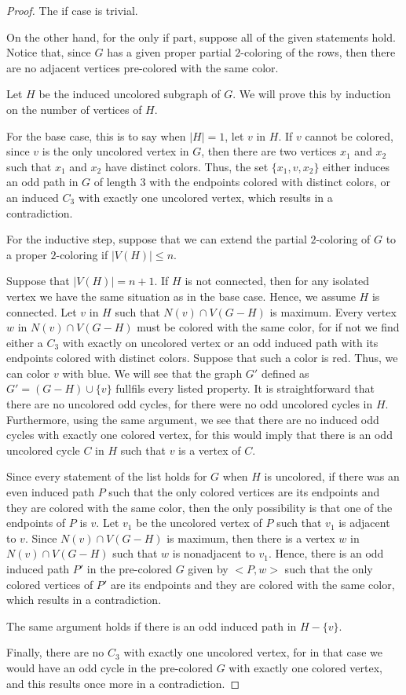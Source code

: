 \documentclass[12pt]{book}
\theoremstyle{plain}
\theoremstyle{remark}
\begin{document}
\begin{proof}
The if case is trivial.

On the other hand, for the only if part, suppose all of the given statements hold. Notice that, since $G$ has a given proper partial $2$-coloring of the rows, then there are no adjacent vertices pre-colored with the same color. 

Let $H$ be the induced uncolored subgraph of $G$. We will prove this by induction on the number of vertices of $H$.

For the base case, this is to say when $|H| = 1$, let $v$ in $H$. If $v$ cannot be colored, since $v$ is the only uncolored vertex in $G$, then there are two vertices $x_1$ and $x_2$ such that $x_1$ and $x_2$ have distinct colors. Thus, the set $\{ x_1, v, x_2 \}$ either induces an odd path in $G$ of length 3 with the endpoints colored with distinct colors, or an induced $C_3$ with exactly one uncolored vertex, which results in a contradiction.

For the inductive step, suppose that we can extend the partial $2$-coloring of $G$ to a proper $2$-coloring if $|V(H)| \leq n$. 

Suppose that $|V(H)| = n+1$. If $H$ is not connected, then for any isolated vertex we have the same situation as in the base case. Hence, we assume $H$ is connected.
Let $v$ in $H$ such that $N(v) \cap V(G-H)$ is maximum. Every vertex $w$ in $N(v) \cap V(G-H)$ must be colored with the same color, for if not we find either a $C_3$ with exactly on uncolored vertex or an odd induced path with its endpoints colored with distinct colors. Suppose that such a color is red. Thus, we can color $v$ with blue.
We will see that the graph $G'$ defined as $G' = (G-H) \cup \{v \}$ fullfils every listed property.
It is straightforward that there are no uncolored odd cycles, for there were no odd uncolored cycles in $H$. Furthermore, using the same argument, we see that there are no induced odd cycles with exactly one colored vertex, for this would imply that there is an odd uncolored cycle $C$ in $H$ such that $v$ is a vertex of $C$.

Since every statement of the list holds for $G$ when $H$ is uncolored, if there was an even induced path $P$ such that the only colored vertices are its endpoints and they are colored with the same color, then the only possibility is that one of the endpoints of $P$ is $v$. 
Let $v_1$ be the uncolored vertex of $P$ such that $v_1$ is adjacent to $v$. Since $N(v) \cap V(G-H)$ is maximum, then there is a vertex $w$ in $N(v) \cap V(G-H)$ such that $w$ is nonadjacent to $v_1$. 
Hence, there is an odd induced path $P'$ in the pre-colored $G$ given by $< P, w >$ such that the only colored vertices of $P'$ are its endpoints and they are colored with the same color, which results in a contradiction.

The same argument holds if there is an odd induced path in $H - \{v\}$.

Finally, there are no $C_3$ with exactly one uncolored vertex, for in that case we would have an odd cycle in the pre-colored $G$ with exactly one colored vertex, and this results once more in a contradiction.
	
\end{proof}
\end{document}
